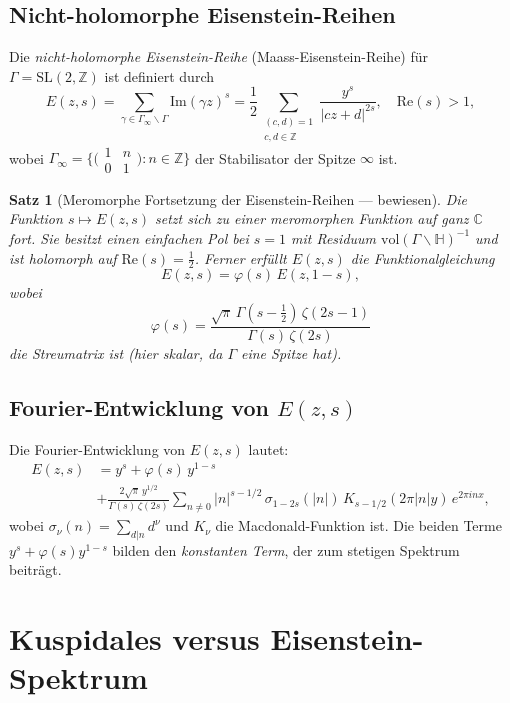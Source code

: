 \documentclass[12pt,a4paper]{amsart}
\newtheorem{theorem}{Satz}[section]
\theoremstyle{definition}
\newcommand{\HH}{\mathbb{H}}
\newcommand{\ZZ}{\mathbb{Z}}
\newcommand{\CC}{\mathbb{C}}
\newcommand{\SL}{\mathrm{SL}}
\newcommand{\vol}{\mathrm{vol}}
\newcommand{\im}{\mathrm{Im}}
\newcommand{\re}{\mathrm{Re}}
\begin{document}
\subsection{Nicht-holomorphe Eisenstein-Reihen}

Die \emph{nicht-holomorphe Eisenstein-Reihe} (Maass-Eisenstein-Reihe) für
$\Gamma = \SL(2,\ZZ)$ ist definiert durch
\[
E(z, s) = \sum_{\gamma \in \Gamma_\infty \backslash \Gamma} \im(\gamma z)^s
= \frac{1}{2} \sum_{\substack{(c,d)=1 \\ c,d \in \ZZ}} \frac{y^s}{|cz+d|^{2s}},
\quad \re(s) > 1,
\]
wobei $\Gamma_\infty = \bigl\{ \bigl(\begin{smallmatrix}1&n\\0&1\end{smallmatrix}\bigr) : n \in \ZZ \bigr\}$
der Stabilisator der Spitze $\infty$ ist.

\begin{theorem}[Meromorphe Fortsetzung der Eisenstein-Reihen — bewiesen]
\label{satz:eisenstein_forts}
Die Funktion $s \mapsto E(z,s)$ setzt sich zu einer meromorphen Funktion auf ganz $\CC$
fort. Sie besitzt einen einfachen Pol bei $s = 1$ mit Residuum $\vol(\Gamma \backslash \HH)^{-1}$
und ist holomorph auf $\re(s) = \frac{1}{2}$. Ferner erfüllt $E(z,s)$ die Funktionalgleichung
\[
E(z, s) = \varphi(s)\, E\!\left(z, 1-s\right),
\]
wobei
\[
\varphi(s) = \frac{\sqrt\pi\, \Gamma(s - \tfrac{1}{2})\,\zeta(2s-1)}{\Gamma(s)\,\zeta(2s)}
\]
die \emph{Streumatrix} ist (hier skalar, da $\Gamma$ eine Spitze hat).
\end{theorem}

\subsection{Fourier-Entwicklung von $E(z,s)$}

Die Fourier-Entwicklung von $E(z,s)$ lautet:
\begin{align*}
E(z,s) &= y^s + \varphi(s)\, y^{1-s} \\
&+ \frac{2\sqrt\pi\, y^{1/2}}{\Gamma(s)\,\zeta(2s)} \sum_{n \neq 0}
|n|^{s-1/2}\, \sigma_{1-2s}(|n|)\, K_{s-1/2}(2\pi|n|y)\, e^{2\pi i n x},
\end{align*}
wobei $\sigma_\nu(n) = \sum_{d|n} d^\nu$ und $K_\nu$ die Macdonald-Funktion ist.
Die beiden Terme $y^s + \varphi(s) y^{1-s}$ bilden den \emph{konstanten Term},
der zum stetigen Spektrum beiträgt.

\section{Kuspidales versus Eisenstein-Spektrum}
\label{sec:kuspidal_eis}
\end{document}

